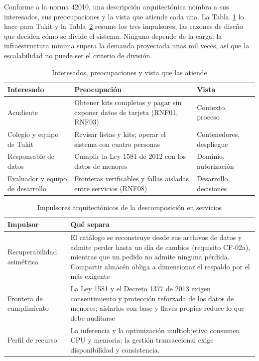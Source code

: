 Conforme a la norma 42010, una descripción arquitectónica nombra a sus interesados, sus preocupaciones y la vista que atiende cada una. La Tabla~\ref{tab:interesados} lo hace para Tukit y la Tabla~\ref{tab:impulsores} resume los tres impulsores, las razones de diseño que deciden cómo se divide el sistema. Ninguno depende de la carga: la infraestructura mínima supera la demanda proyectada unas mil veces, así que la escalabilidad no puede ser el criterio de división.

\begin{table}[!htb]
\centering
\caption{Interesados, preocupaciones y vista que las atiende}
\label{tab:interesados}
\small
\begin{tabular}{@{}p{3.0cm}p{6.6cm}p{4.2cm}@{}}
\toprule
\textbf{Interesado} & \textbf{Preocupación} & \textbf{Vista} \\
\midrule
Acudiente & Obtener kits completos y pagar sin exponer datos de tarjeta (RNF01, RNF03) & Contexto, proceso \\
Colegio y equipo de Tukit & Revisar listas y kits; operar el sistema con cuatro personas & Contenedores, despliegue \\
Responsable de datos & Cumplir la Ley 1581 de 2012 con los datos de menores & Dominio, autorización \\
Evaluador y equipo de desarrollo & Fronteras verificables y fallas aisladas entre servicios (RNF08) & Desarrollo, decisiones \\
\bottomrule
\end{tabular}
\end{table}

\begin{table}[!htb]
\centering
\caption{Impulsores arquitectónicos de la descomposición en servicios}
\label{tab:impulsores}
\small
\begin{tabular}{@{}p{3.0cm}p{10.8cm}@{}}
\toprule
\textbf{Impulsor} & \textbf{Qué separa} \\
\midrule
Recuperabilidad asimétrica & El catálogo se reconstruye desde sus archivos de datos y admite perder hasta un día de cambios (requisito CF-02a), mientras que un pedido no admite ninguna pérdida. Compartir almacén obliga a dimensionar el respaldo por el más exigente \\
\addlinespace
Frontera de cumplimiento & La Ley 1581 \citep{congreso_ley1581_2012} y el Decreto 1377 de 2013 \citep{presidencia_decreto1377_2013} exigen consentimiento y protección reforzada de los datos de menores; aislarlos con base y llaves propias reduce lo que debe auditarse \\
\addlinespace
Perfil de recurso & La inferencia y la optimización multiobjetivo consumen CPU y memoria; la gestión transaccional exige disponibilidad y consistencia. \\
\bottomrule
\end{tabular}
\end{table}

